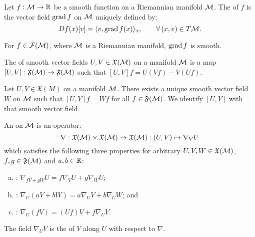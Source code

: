 \documentclass[11pt,a4paper]{article}
\begin{document}
\begin{mydef}
Let $f:\mathcal{M}\rightarrow \mathbb{R}$ be a smooth function on a Riemannian manifold $\mathcal{M}$. The  of $f$ is the vector field $\text{grad}\, f$ on $\mathcal{M}$ uniquely defined by:
\begin{equation*}
    Df(x)[v] = \langle v, \text{grad}\, f(x) \rangle_x, \qquad \forall\,(x,v)\in T\mathcal{M}.
\end{equation*}
\end{mydef}

\begin{prop}
For $f\in \mathcal{F}(\mathcal{M})$, where $\mathcal{M}$ is a Riemannian manifold, $\text{grad}\, f$ is smooth.
\end{prop}

\begin{mydef}
The  of smooth vector fields $U,V\in \mathfrak{X}(\mathcal{M})$ on a manifold $\mathcal{M}$ is a map $[U,V]:\mathfrak{F}(\mathcal{M})\rightarrow \mathfrak{F}(\mathcal{M})$ such that $[U,V]f = U(Vf) - V(Uf)$.
\end{mydef}

\begin{prop}
Let $U,V\in \mathfrak{X}(M)$ on a manifold $\mathcal{M}$. There exists a unique smooth vector field $W$ on $\mathcal{M}$ such that $[U,V]f = Wf$ for all $f\in \mathfrak{F}(\mathcal{M})$. We identify $[U,V]$ with that smooth vector field.
\end{prop}

\begin{mydef}
An  on $\mathcal{M}$ is an operator:
\begin{equation*}
\nabla:\mathfrak{X}(\mathcal{M})\times \mathfrak{X}(\mathcal{M})\rightarrow \mathfrak{X}(\mathcal{M}): (U,V)\mapsto \nabla_V U
\end{equation*}
which satisfies the following three properties for arbitrary $U,V,W\in \mathfrak{X}(\mathcal{M})$, $f,g\in\mathfrak{F}(\mathcal{M})$ and $a,b\in \mathbb{R}$:
\begin{enumerate}[(a)]
    \item {}: $\nabla_{fV+gW}U = f\nabla_V U + g\nabla_W U$;
    \item {}: $\nabla_U(aV+bW) = a\nabla_U V+b\nabla_U W$; and
    \item {}: $\nabla_U (fV) = (Uf)V + f\nabla_U V$.
\end{enumerate}
The field $\nabla_U V$ is the  of $V$ along $U$ with respect to $\nabla$. 
\end{mydef}
\end{document}
